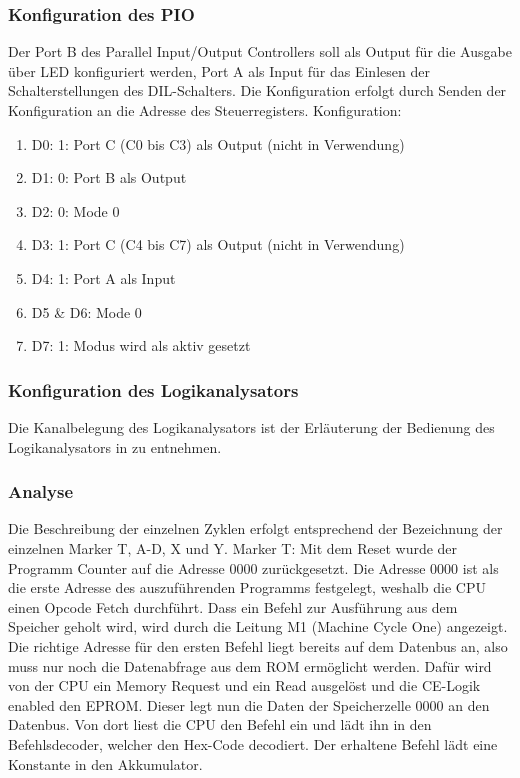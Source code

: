 \subsubsection{Konfiguration des PIO}
Der Port B des Parallel Input/Output Controllers soll als Output für die Ausgabe über LED konfiguriert werden, Port A als Input für das Einlesen der Schalterstellungen des DIL-Schalters. Die Konfiguration erfolgt durch Senden der Konfiguration an die Adresse des Steuerregisters.
Konfiguration:
\begin{enumerate}
    \item D0: 1: Port C (C0 bis C3) als Output (nicht in Verwendung)
    \item D1: 0: Port B als Output 
    \item D2: 0: Mode 0 
    \item D3: 1: Port C (C4 bis C7) als Output (nicht in Verwendung)
    \item D4: 1: Port A als Input
    \item D5 \& D6: Mode 0
    \item D7: 1: Modus wird als aktiv gesetzt
\end{enumerate}

\subsubsection{Konfiguration des Logikanalysators}
Die Kanalbelegung des Logikanalysators ist der Erläuterung der Bedienung des Logikanalysators in  zu entnehmen.

\subsubsection{Analyse}
Die Beschreibung der einzelnen Zyklen erfolgt entsprechend der Bezeichnung der einzelnen Marker T, A-D, X und Y.
Marker T: Mit dem Reset wurde der Programm Counter auf die Adresse 0000 zurückgesetzt. Die Adresse 0000 ist als die erste Adresse des auszuführenden Programms festgelegt, weshalb die CPU einen Opcode Fetch durchführt. Dass ein Befehl zur Ausführung aus dem Speicher geholt wird, wird durch die Leitung M1 (Machine Cycle One) angezeigt. Die richtige Adresse für den ersten Befehl liegt bereits auf dem Datenbus an, also muss nur noch die Datenabfrage aus dem ROM ermöglicht werden. Dafür wird von der CPU ein Memory Request und ein Read ausgelöst und die CE-Logik enabled den EPROM. Dieser legt nun die Daten der Speicherzelle 0000 an den Datenbus. Von dort liest die CPU den Befehl ein und lädt ihn in den Befehlsdecoder, welcher den Hex-Code decodiert. Der erhaltene Befehl lädt eine Konstante in den Akkumulator.


